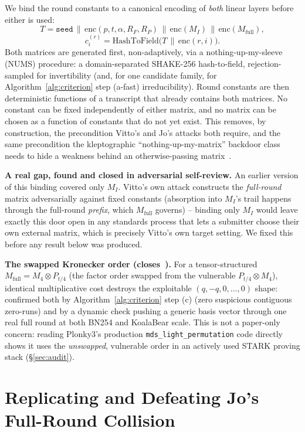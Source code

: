 \documentclass[conference]{IEEEtran}
\theoremstyle{definition}
\theoremstyle{plain}
\begin{document}
We bind the round constants to a canonical encoding of \emph{both}
linear layers before either is used:
\[
  T=\texttt{seed}\,\|\,\mathrm{enc}(p,t,\alpha,R_F,R_P)\,\|\,
  \mathrm{enc}(M_I)\,\|\,\mathrm{enc}(M_{\mathrm{full}}),
\]
\[
  c^{(r)}_i = \mathrm{HashToField}\big(T\,\|\,\mathrm{enc}(r,i)\big).
\]
Both matrices are generated first, non-adaptively, via a
nothing-up-my-sleeve (NUMS) procedure: a domain-separated SHAKE-256
hash-to-field, rejection-sampled for invertibility (and, for one
candidate family, for Algorithm~\ref{alg:criterion} step (a-fast)
irreducibility). Round constants are then deterministic functions of a
transcript that already contains both matrices. No constant can be fixed
independently of either matrix, and no matrix can be chosen as a
function of constants that do not yet exist. This removes, by
construction, the precondition Vitto's and Jo's attacks both require,
and the same precondition the kleptographic ``nothing-up-my-matrix''
backdoor class needs to hide a weakness behind an otherwise-passing
matrix~\cite{backdoor2026}.

\textbf{A real gap, found and closed in adversarial self-review.} An
earlier version of this binding covered only $M_I$. Vitto's own attack
constructs the \emph{full-round} matrix adversarially against fixed
constants (absorption into $M_I$'s trail happens through the full-round
\emph{prefix}, which $M_{\mathrm{full}}$ governs) -- binding only $M_I$
would leave exactly this door open in any standards process that lets a
submitter choose their own external matrix, which is precisely Vitto's
own target setting. We fixed this before any result below was produced.

\textbf{The swapped Kronecker order (closes~\cite{cryptoeprint:2026/306}).}
For a tensor-structured $M_{\mathrm{full}}=M_4\otimes P_{t/4}$ (the
factor order swapped from the vulnerable $P_{t/4}\otimes M_4$), identical
multiplicative cost destroys the exploitable $(q,-q,0,\ldots,0)$ shape:
confirmed both by Algorithm~\ref{alg:criterion} step (c) (zero suspicious
contiguous zero-runs) and by a dynamic check pushing a generic basis
vector through one real full round at both BN254 and KoalaBear scale.
This is not a paper-only concern: reading Plonky3's production
\texttt{mds\_light\_permutation} code directly shows it uses the
\emph{unswapped}, vulnerable order in an actively used STARK proving
stack (\S\ref{sec:audit}).

\section{Replicating and Defeating Jo's Full-Round Collision}
\label{sec:midpoint-reset}
\end{document}
